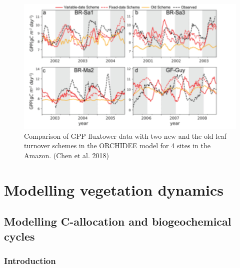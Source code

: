 \documentclass[12pt,oneside]{book}
\begin{document}
\begin{figure}

{\centering \includegraphics[width=0.8\linewidth]{figures/chap4/f413_chen3} 

}

\caption{Comparison of GPP fluxtower data with two new and the old leaf turnover schemes in the ORCHIDEE model for 4 sites in the Amazon. (Chen et al. 2018)}\label{fig:f413}
\end{figure}

\part{Modelling vegetation
dynamics}\label{part-modelling-vegetation-dynamics}

\chapter{Modelling C-allocation and biogeochemical
cycles}\label{modelling-c-allocation-and-biogeochemical-cycles}


\section{Introduction}\label{introduction-1}
\end{document}
